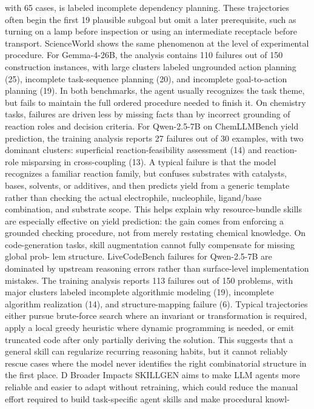 with 65 cases, is labeled incomplete dependency planning. These trajectories often begin the first
19
plausible subgoal but omit a later prerequisite, such as turning on a lamp before inspection or using an
intermediate receptacle before transport. ScienceWorld shows the same phenomenon at the level of
experimental procedure. For Gemma-4-26B, the analysis contains 110 failures out of 150 construction
instances, with large clusters labeled ungrounded action planning (25), incomplete task-sequence
planning (20), and incomplete goal-to-action planning (19). In both benchmarks, the agent usually
recognizes the task theme, but fails to maintain the full ordered procedure needed to finish it.
On chemistry tasks, failures are driven less by missing facts than by incorrect grounding of
reaction roles and decision criteria.
For Qwen-2.5-7B on ChemLLMBench yield prediction,
the training analysis reports 27 failures out of 30 examples, with two dominant clusters: superficial
reaction-feasibility assessment (14) and reaction-role misparsing in cross-coupling (13). A typical
failure is that the model recognizes a familiar reaction family, but confuses substrates with catalysts,
bases, solvents, or additives, and then predicts yield from a generic template rather than checking the
actual electrophile, nucleophile, ligand/base combination, and substrate scope. This helps explain
why resource-bundle skills are especially effective on yield prediction: the gain comes from enforcing
a grounded checking procedure, not from merely restating chemical knowledge.
On code-generation tasks, skill augmentation cannot fully compensate for missing global prob-
lem structure.
LiveCodeBench failures for Qwen-2.5-7B are dominated by upstream reasoning
errors rather than surface-level implementation mistakes. The training analysis reports 113 failures
out of 150 problems, with major clusters labeled incomplete algorithmic modeling (19), incomplete
algorithm realization (14), and structure-mapping failure (6). Typical trajectories either pursue
brute-force search where an invariant or transformation is required, apply a local greedy heuristic
where dynamic programming is needed, or emit truncated code after only partially deriving the
solution. This suggests that a general skill can regularize recurring reasoning habits, but it cannot
reliably rescue cases where the model never identifies the right combinatorial structure in the first
place.
D
Broader Impacts
SKILLGEN aims to make LLM agents more reliable and easier to adapt without retraining, which
could reduce the manual effort required to build task-specific agent skills and make procedural knowl-

